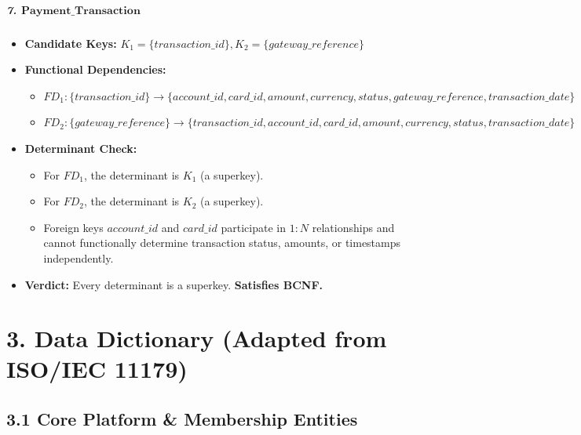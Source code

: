 \subparagraph{\texorpdfstring{\textbf{7.} \(\mathbf{Payment\_\allowbreak{} Transaction}\)}{7. \mathbf\{Payment\_\allowbreak{} Transaction\}}}\label{mathbfpayment_-transaction}

\begin{itemize}
\item
  \textbf{Candidate Keys:} \(K_{1} = \{ transaction\_\allowbreak{} id\},K_{2} = \{ gateway\_\allowbreak{} reference\}\)
\item
  \textbf{Functional Dependencies:}

  \begin{itemize}
  \item
    \(FD_{1}:\{ transaction\_\allowbreak{} id\} \rightarrow \{ account\_\allowbreak{} id,card\_\allowbreak{} id,amount,currency,status,gateway\_\allowbreak{} reference,transaction\_\allowbreak{} date\}\)
  \item
    \(FD_{2}:\{ gateway\_\allowbreak{} reference\} \rightarrow \{ transaction\_\allowbreak{} id,account\_\allowbreak{} id,card\_\allowbreak{} id,amount,currency,status,transaction\_\allowbreak{} date\}\)
  \end{itemize}
\item
  \textbf{Determinant Check:}

  \begin{itemize}
  \item
    For \(FD_{1}\), the determinant is \(K_{1}\) (a superkey).
  \item
    For \(FD_{2}\), the determinant is \(K_{2}\) (a superkey).
  \item
    Foreign keys \(account\_\allowbreak{} id\) and \(card\_\allowbreak{} id\) participate in \(1:N\) relationships and cannot functionally determine transaction status, amounts, or timestamps independently.
  \end{itemize}
\item
  \textbf{Verdict:} Every determinant is a superkey. \textbf{Satisfies BCNF.}
\end{itemize}

\section*{3. Data Dictionary (Adapted from ISO/IEC 11179)}

\subsection*{3.1 Core Platform \& Membership Entities}

